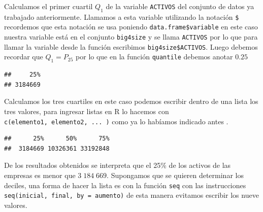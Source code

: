 \documentclass[
]{krantz}
\makeatletter
\newenvironment{Shaded}{\begin{snugshade}}{\end{snugshade}}
\newcommand{\DataTypeTok}[1]{\textcolor[rgb]{0.27,0.27,0.27}{#1}}
\newcommand{\FloatTok}[1]{\textcolor[rgb]{0.06,0.06,0.06}{#1}}
\newcommand{\KeywordTok}[1]{\textcolor[rgb]{0.27,0.27,0.27}{\textbf{#1}}}
\newcommand{\NormalTok}[1]{#1}
\newcommand{\OperatorTok}[1]{\textcolor[rgb]{0.43,0.43,0.43}{\textbf{#1}}}
\newenvironment{kframe}{%
\medskip{}
\setlength{\fboxsep}{.8em}
 \def\at@end@of@kframe{}%
 \ifinner\ifhmode%
  \def\at@end@of@kframe{\end{minipage}}%
  \begin{minipage}{\columnwidth}%
 \fi\fi%
 \def\FrameCommand##1{\hskip\@totalleftmargin \hskip-\fboxsep
 \colorbox{shadecolor}{##1}\hskip-\fboxsep
     \hskip-\linewidth \hskip-\@totalleftmargin \hskip\columnwidth}%
 \MakeFramed {\advance\hsize-\width
   \@totalleftmargin\z@ \linewidth\hsize
   \@setminipage}}%
 {\par\unskip\endMakeFramed%
 \at@end@of@kframe}
\renewenvironment{Shaded}{\begin{kframe}}{\end{kframe}}
\makeatother
\begin{document}
Calculamos el primer cuartil \(Q_{1}\) de la variable \texttt{ACTIVOS} del conjunto de datos ya trabajado anteriormente. Llamamos a esta variable utilizando la notación \texttt{\$} recordemos que esta notación se usa poniendo \texttt{data.frame\$variable} en este caso nuestra variable está en el conjunto \texttt{big4size} y se llama \texttt{ACTIVOS} por lo que para llamar la variable desde la función escribimos \texttt{big4size\$ACTIVOS}. Luego debemos recordar que \(Q_1=P_{25}\) por lo que en la función \texttt{quantile} debemos anotar \(0.25\)

\begin{Shaded}
\end{Shaded}

\begin{verbatim}
##     25% 
## 3184669
\end{verbatim}

Calculamos los tres cuartiles en este caso podemos escribir dentro de una lista los tres valores, para ingresar listas en R lo hacemos con \texttt{c(elemento1,\ elemento2,\ ...\ )} como ya lo habíamos indicado antes \citep{williams2017}.

\begin{Shaded}
\end{Shaded}

\begin{verbatim}
##      25%      50%      75% 
##  3184669 10326361 33192848
\end{verbatim}

De los resultados obtenidos se interpreta que el 25\% de los activos de las empresas es menor que \(3\;184\;669\). Supongamos que se quieren determinar los deciles, una forma de hacer la lista es con la función \texttt{seq} con las instrucciones \texttt{seq(inicial,\ final,\ by\ =\ aumento)} de esta manera evitamos escribir los nueve valores.

\begin{Shaded}
\end{Shaded}
\end{document}
